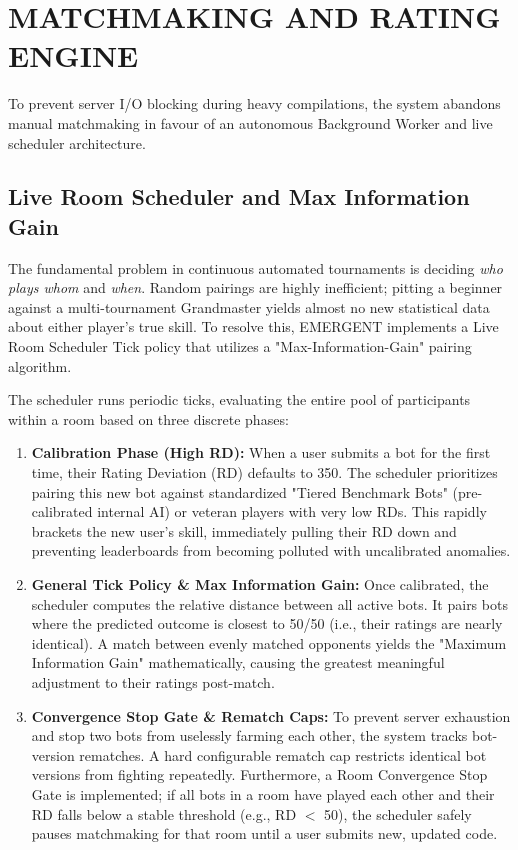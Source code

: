 \documentclass[12pt,a4paper]{report}
\begin{document}
\section{MATCHMAKING AND RATING ENGINE}
To prevent server I/O blocking during heavy compilations, the system abandons manual matchmaking in favour of an autonomous Background Worker and live scheduler architecture. 

\subsection{Live Room Scheduler and Max Information Gain}
The fundamental problem in continuous automated tournaments is deciding \textit{who plays whom} and \textit{when}. Random pairings are highly inefficient; pitting a beginner against a multi-tournament Grandmaster yields almost no new statistical data about either player's true skill. To resolve this, EMERGENT implements a Live Room Scheduler Tick policy that utilizes a "Max-Information-Gain" pairing algorithm.

The scheduler runs periodic ticks, evaluating the entire pool of participants within a room based on three discrete phases:

\begin{enumerate}
    \item \textbf{Calibration Phase (High RD):} When a user submits a bot for the first time, their Rating Deviation (RD) defaults to 350. The scheduler prioritizes pairing this new bot against standardized "Tiered Benchmark Bots" (pre-calibrated internal AI) or veteran players with very low RDs. This rapidly brackets the new user's skill, immediately pulling their RD down and preventing leaderboards from becoming polluted with uncalibrated anomalies.
    \item \textbf{General Tick Policy \& Max Information Gain:} Once calibrated, the scheduler computes the relative distance between all active bots. It pairs bots where the predicted outcome is closest to 50/50 (i.e., their ratings are nearly identical). A match between evenly matched opponents yields the "Maximum Information Gain" mathematically, causing the greatest meaningful adjustment to their ratings post-match.
    \item \textbf{Convergence Stop Gate \& Rematch Caps:} To prevent server exhaustion and stop two bots from uselessly farming each other, the system tracks bot-version rematches. A hard configurable rematch cap restricts identical bot versions from fighting repeatedly. Furthermore, a Room Convergence Stop Gate is implemented; if all bots in a room have played each other and their RD falls below a stable threshold (e.g., RD $<$ 50), the scheduler safely pauses matchmaking for that room until a user submits new, updated code.
\end{enumerate}
\end{document}
